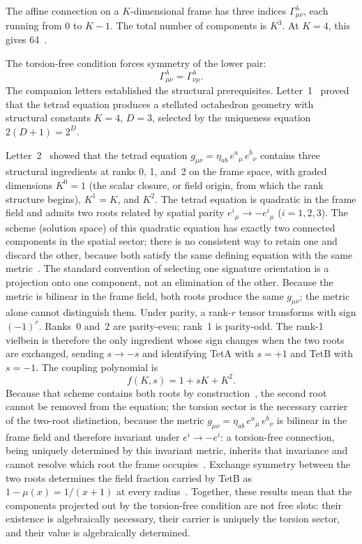 \documentclass[twocolumn]{iopjournal}
\begin{document}
The affine connection on a $K$-dimensional frame has three
indices $\Gamma^\lambda_{\mu\nu}$, each running from 0 to
$K - 1$.  The total number of components is $K^3$.  At
$K = 4$, this gives 64~\cite{Nelson2026b,Hehl1976}.

The torsion-free condition forces symmetry of the lower pair:
\begin{equation}
  \Gamma^\lambda_{\mu\nu} = \Gamma^\lambda_{\nu\mu}.
  \label{eq:torsion_free}
\end{equation}
The companion letters established the structural
prerequisites.  Letter~1~\cite{Nelson2026a} proved that
the tetrad equation produces a stellated octahedron geometry
with structural constants $K = 4$, $D = 3$, selected by the
uniqueness equation $2(D{+}1) = 2^D$.

Letter~2~\cite{Nelson2026b} showed that
the tetrad equation
$g_{\mu\nu} = \eta_{ab}\,e^a{}_\mu\,e^b{}_\nu$ contains
three structural ingredients at ranks 0, 1, and~2 on the
frame space, with graded dimensions $K^0 = 1$ (the scalar
closure, or field origin, from which the rank structure
begins), $K^1 = K$, and $K^2$.  The tetrad equation is quadratic in the frame
field and admits two roots related by spatial parity
$e^i{}_\mu \to -e^i{}_\mu$ ($i = 1,2,3$).  The scheme (solution space) of
this quadratic equation has exactly two connected components
in the spatial sector; there is no consistent way to retain
one and discard the other, because both satisfy the same
defining equation with the same
metric~\cite{Nelson2026a}.  The standard convention of
selecting one signature orientation is a projection onto one
component, not an elimination of the other.  Because the
metric is bilinear in the frame field, both roots produce the
same $g_{\mu\nu}$; the metric alone cannot distinguish
them.  Under parity,
a rank-$r$ tensor transforms with sign $(-1)^r$.  Ranks~0
and~2 are parity-even; rank~1 is parity-odd.  The rank-1
vielbein is therefore the only ingredient whose sign changes
when the two roots are exchanged, sending $s \to -s$ and
identifying TetA with $s = +1$ and TetB with $s = -1$.  The
coupling polynomial is
\begin{equation}
  f(K,s) = 1 + sK + K^2.
  \label{eq:poly}
\end{equation}
Because that scheme contains both roots by
construction~\cite{Nelson2026a}, the second root cannot be
removed from the equation; the torsion sector is
the necessary carrier of the two-root distinction, because
the metric $g_{\mu\nu} = \eta_{ab}\,e^a{}_\mu\,e^b{}_\nu$
is bilinear in the frame field and therefore invariant under
$e^i \to -e^i$: a torsion-free connection, being uniquely
determined by this invariant metric, inherits that invariance
and cannot resolve which root the frame
occupies~\cite{Nelson2026b}.  Exchange symmetry between the two
roots determines the field fraction carried by TetB as
$1 - \mu(x) = 1/(x{+}1)$ at every
radius~\cite{Nelson2026b}.  Together, these results mean
that the components projected out by the torsion-free
condition are not free slots: their existence is algebraically
necessary, their carrier is uniquely the torsion sector, and
their value is algebraically determined.
\end{document}
